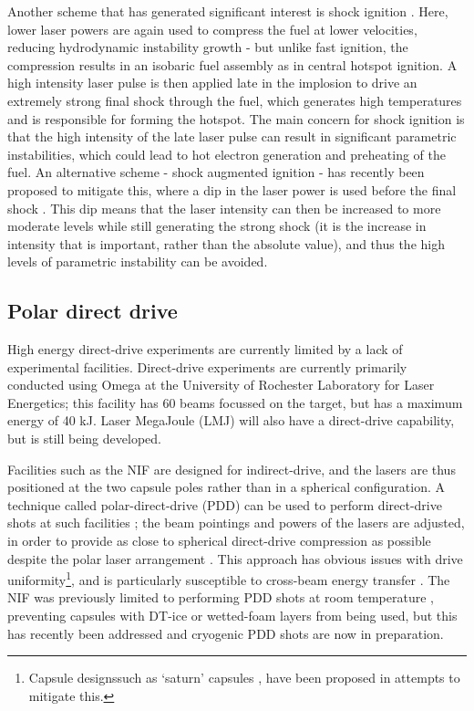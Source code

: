 Another scheme that has generated significant interest is shock ignition \cite{Betti2007}. Here, lower laser powers are again used to compress the fuel at lower velocities, reducing hydrodynamic instability growth - but unlike fast ignition, the compression results in an isobaric fuel assembly as in central hotspot ignition. A high intensity laser pulse is then applied late in the implosion to drive an extremely strong final shock through the fuel, which generates high temperatures and is responsible for forming the hotspot. The main concern for shock ignition is that the high intensity of the late laser pulse can result in significant parametric instabilities, which could lead to hot electron generation and preheating of the fuel. An alternative scheme - shock augmented ignition - has recently been proposed to mitigate this, where a dip in the laser power is used before the final shock \cite{Scott2022}. This dip means that the laser intensity can then be increased to more moderate levels while still generating the strong shock (it is the increase in intensity that is important, rather than the absolute value), and thus the high levels of parametric instability can be avoided.

\subsection{Polar direct drive}
High energy direct-drive experiments are currently limited by a lack of experimental facilities. Direct-drive experiments are currently primarily conducted using Omega at the University of Rochester Laboratory for Laser Energetics; this facility has 60 beams focussed on the target, but has a maximum energy of 40 \unit{\kilo\joule}. Laser MegaJoule (LMJ) will also have a direct-drive capability, but is still being developed. 

Facilities such as the NIF are designed for indirect-drive, and the lasers are thus positioned at the two capsule poles rather than in a spherical configuration. A technique called polar-direct-drive (PDD) can be used to perform direct-drive shots at such facilities \cite{Skupsky2004}; the beam pointings and powers of the lasers are adjusted, in order to provide as close to spherical direct-drive compression as possible despite the polar laser arrangement \cite{Craxton2005}. This approach has obvious issues with drive uniformity\footnote{Capsule designssuch as `saturn' capsules \cite{Craxton2005}, have been proposed in attempts to mitigate this.}, and is particularly susceptible to cross-beam energy transfer \cite{Collins2018}. The NIF was previously limited to performing PDD shots at room temperature \cite{Hohenberger2015}, preventing capsules with DT-ice or wetted-foam layers from being used, but this has recently been addressed and cryogenic PDD shots are now in preparation.


